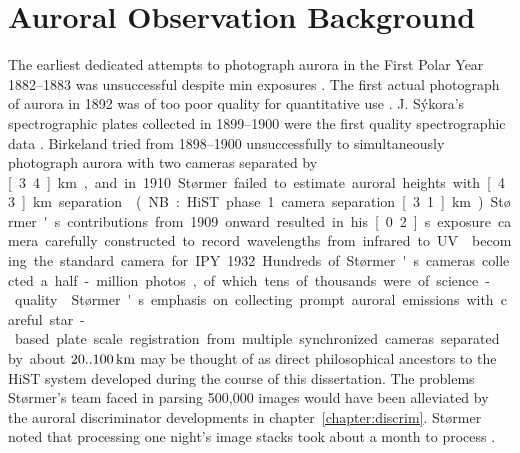 \section{Auroral Observation Background}\label{sec:obshistory}
The earliest dedicated attempts to photograph aurora in the First Polar Year 1882--1883 was unsuccessful despite \unit[4]{min} exposures \citep{egeland2013}.
The first actual photograph of aurora in 1892 was of too poor quality for quantitative use \citep{egeland2013}.
J. Sýkora's spectrographic plates collected in 1899--1900 were the first quality spectrographic data \citep{chernouss2008}. 
Birkeland tried from 1898--1900 unsuccessfully to simultaneously photograph aurora with two cameras separated by \unit[3.4]{km}, and in 1910 Størmer failed to estimate auroral heights with \unit[4.3]{km} separation \citep{egeland2013} (NB: HiST phase 1 camera separation \unit[3.1]{km}).
Størmer's contributions from 1909 onward resulted in his \unit[0.2]{s} exposure camera carefully constructed to record wavelengths from infrared to UV \citep{stormer1932} becoming the standard camera for IPY 1932.
Hundreds of Størmer's cameras collected a half-million photos, of which tens of thousands were of science-quality \citep{egeland2013}.
Størmer's emphasis on collecting prompt auroral emissions with careful star-based plate scale registration from multiple synchronized cameras separated by about $\unit[20..100]{km}$ may be thought of as direct philosophical ancestors to the HiST system developed during the course of this dissertation.
The problems Størmer's team faced in parsing 500,000 images would have been alleviated by the auroral discriminator developments in chapter~\ref{chapter:discrim}.
Størmer noted that processing one night's image stacks took about a month to process \citep{egeland2013}.


